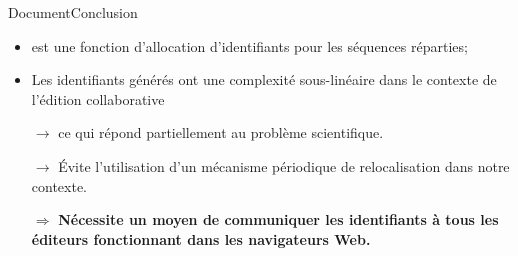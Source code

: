 







\begin{frame}{Document}{Conclusion}

  \begin{itemize}
  \item \LSEQ est une fonction d'allocation d'identifiants pour les séquences
    réparties;
  \item Les identifiants générés ont une complexité sous-linéaire dans le contexte
    de l'édition collaborative
  \item [$\rightarrow$] ce qui répond partiellement au problème scientifique.
  \item [$\rightarrow$] Évite l'utilisation d'un mécanisme périodique de
    relocalisation dans notre contexte.
  \end{itemize}


  \vspace{1cm}
  
  \large
  \begin{itemize}
  \item [$\Rightarrow$] \textbf{Nécessite un moyen de communiquer les
      identifiants à tous les éditeurs fonctionnant dans les navigateurs Web.}
  \end{itemize}
  
\end{frame}




